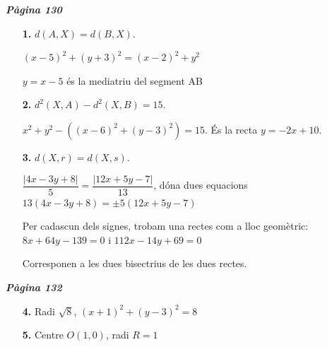 \documentclass[a4paper, pdf, twoside]{book}
\begin{document}
\begin{multicols}{2}
{\textbf{\em Pàgina 130}} \hrulefill
\begin{enumerate}
\vspace{0.25cm}
\item[\fontfamily{phv}\selectfont\color{blue}\textbf{1. }] 
$d(A,X)=d(B,X)$.\par $(x-5)^2+(y+3)^2=(x-2)^2+y^2$\par $y=x-5$ és la mediatriu del segment AB
 \end{enumerate}
\begin{enumerate}
\vspace{0.25cm}
\item[\fontfamily{phv}\selectfont\color{blue}\textbf{2. }] 
$d^2(X,A)-d^2(X,B)=15$.\par $x^2+y^2 - \left ( (x-6)^2+(y-3)^2 \right )=15$. És la recta $y=-2x+10$.
\vspace{0.25cm}
\item[\fontfamily{phv}\selectfont\color{blue}\textbf{3. }] 
$d(X,r)=d(X,s)$.\par $\dfrac {|4x-3y+8|}{5}=\dfrac {|12x+5y-7|}{13}$, dóna dues equacions $13(4x-3y+8)=\pm 5(12x+5y-7)$\par Per cadascun dels signes, trobam una rectes com a lloc geomètric: $8x+64y-139=0$ i $112x-14y+69=0$\par Corresponen a les dues bisectrius de les dues rectes. \par {} 
 \end{enumerate}
\vspace{0.3cm}


{\textbf{\em Pàgina 132}} \hrulefill
\begin{enumerate}
\vspace{0.25cm}
\item[\fontfamily{phv}\selectfont\color{blue}\textbf{4. }]  \scalebox{0.6}{\simbolclau } 
Radi $\sqrt {8}$, $(x+1)^2+(y-3)^2=8$
 \end{enumerate}
\begin{enumerate}
\vspace{0.25cm}
\item[\fontfamily{phv}\selectfont\color{blue}\textbf{5. }]  \scalebox{0.6}{\simbolclau } 
Centre $O(1,0)$, radi $R=1$
 \end{enumerate}
\vspace{0.3cm}



\end{multicols}
\end{document}
